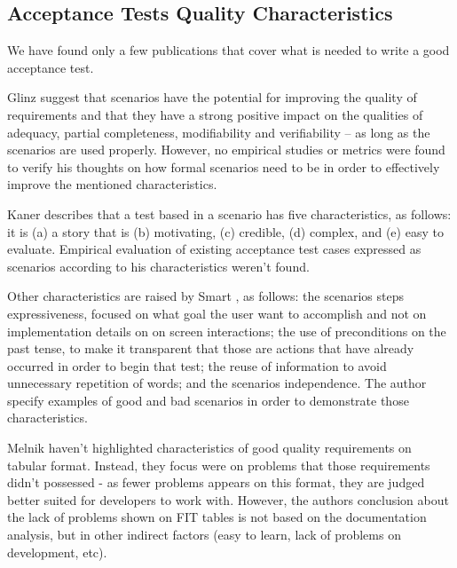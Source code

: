 \subsection{Acceptance Tests Quality Characteristics}

We have found only a few publications that cover what is needed to write a good acceptance test.

Glinz \cite{Glinz_2000} suggest that scenarios have the potential for improving the quality of requirements and that they have a strong positive impact on the qualities of adequacy, partial completeness, modifiability and verifiability
– as long as the scenarios are used properly. However, no empirical studies or metrics were found to verify his thoughts on how formal scenarios need to be in order to effectively improve the mentioned characteristics.

Kaner \cite{Kaner_2003} describes that a test based in a scenario has five characteristics, as follows: it is (a) a story that is (b) motivating, (c) credible, (d) complex, and (e) easy to evaluate. Empirical evaluation of existing acceptance test cases expressed as scenarios according to his characteristics weren't found.

Other characteristics are raised by Smart \cite{Smart_2014}, as follows: the scenarios steps expressiveness, focused on what goal the user want to accomplish and not on implementation details on on screen interactions; the use of preconditions on the past tense, to make it transparent that those are actions that have already occurred in order to begin that test; the reuse of information to avoid unnecessary repetition of words; and the scenarios independence. The author specify examples of good and bad scenarios in order to demonstrate those characteristics.

Melnik \cite{Melnik_2004} haven't highlighted characteristics of good quality requirements on tabular format. Instead, they focus were on problems that those requirements didn't possessed - as fewer problems appears on this format, they are judged better suited for developers to work with. However, the authors conclusion about the lack of problems shown on FIT tables is not based on the documentation analysis, but in other indirect factors (easy to learn, lack of problems on development, etc).

